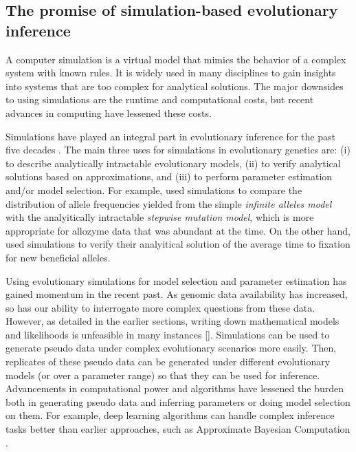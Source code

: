 \subsection{The promise of simulation-based evolutionary inference}

A computer simulation is a virtual model that mimics the behavior of a complex system with known rules.
It is widely used in many disciplines to gain insights into systems that are too complex for analytical solutions.
The major downsides to using simulations are the runtime and computational costs,
but recent advances in computing have lessened these costs.

Simulations have played an integral part in evolutionary inference for the past five decades \citep{hoban_computer_2012}.
The main three uses for simulations in evolutionary genetics are: (i) to describe analytically intractable evolutionary models, (ii) to verify analytical solutions based on approximations, and (iii) to perform parameter estimation and/or model selection.
For example, \citet{ohta_simulation_1974} used simulations to compare the distribution of allele frequencies yielded from the simple \emph{infinite alleles model} with the analyitically intractable \emph{stepwise mutation model},
which is more appropriate for allozyme data that was abundant at the time.
On the other hand, \citet{kimura_average_1980} used simulations to verify their analyitical solution of the average time to fixation for new beneficial alleles. 

Using evolutionary simulations for model selection and parameter estimation has gained momentum in the recent past.
As genomic data availability has increased, so has our ability to interrogate more complex questions from these data.
However, as detailed in the earlier sections, writing down mathematical models and likelihoods is unfeasible in many instances \citep{coop_patterns_2012}[\eg].
Simulations can be used to generate pseudo data under complex evolutionary scenarios more easily.
Then, replicates of these pseudo data can be generated under different evolutionary models (or over a parameter range) so that they can be used for inference.
Advancements in computational power and algorithms have lessened the burden both in generating pseudo data and inferring parameters or doing model selection on them.
For example, deep learning algorithms can handle complex inference tasks better than earlier approaches, such as Approximate Bayesian Computation \citep{sheehan_deep_2016}.


